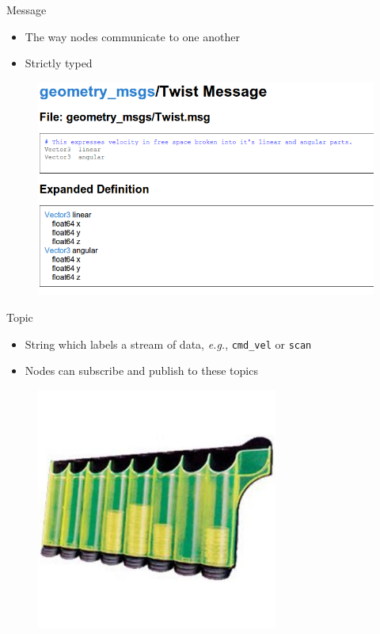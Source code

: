 \documentclass{beamer}
\begin{document}
\begin{frame}{Message}
  \begin{itemize}
  \item The way nodes communicate to one another
  \item Strictly typed
  \end{itemize}

  \begin{figure}
    \includegraphics[scale=0.30]{geometry-message.png}
  \end{figure}
\end{frame}

\begin{frame}{Topic}
  \begin{itemize}
  \item String which labels a stream of data, \emph{e.g.},
    \texttt{cmd\_vel} or \texttt{scan}
  \item Nodes can subscribe and publish to these topics
  \end{itemize}

  \begin{figure}
    \includegraphics[scale=0.5]{coin_sorter_green.jpg}
  \end{figure}
\end{frame}
\end{document}
